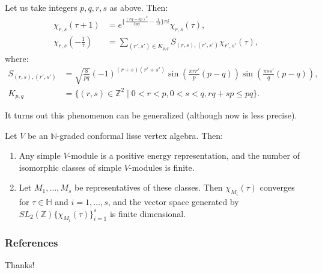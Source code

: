 \documentclass{beamer}
\begin{document}
\begin{frame}
  \begin{theorem}
    \label{thr:4}
    Let us take integers $p, q, r, s$ as above.
    Then:
    \begin{align}
      \label{eq:3}
      \chi_{r, s}(\tau + 1) &= e^{\{\frac{(rq - sp)^2}{2pq} - \frac{1}{12}\}\pi i}\chi_{r, s}(\tau), \\
      \label{eq:4}
      \chi_{r, s}\left(-\frac{1}{\tau}\right) &= \sum_{(r', s') \in K_{p, q}}S_{(r, s), (r', s')}\chi_{r', s'}(\tau),
    \end{align}
    where:
    \begin{align*}
      S_{(r, s), (r', s')} &= \sqrt{\frac{8}{pq}}(-1)^{(r + s)(r' + s')}\sin\left(\frac{\pi rr'}{p}(p - q)\right)\sin\left(\frac{\pi ss'}{q}(p - q)\right), \\
      K_{p, q} &= \{(r, s) \in \mathbb{Z}^2 \mid 0 < r < p, 0 < s < q, rq + sp \le pq\}.
    \end{align*}
  \end{theorem}
\end{frame}

\begin{frame}
  It turns out this phenomenon can be generalized (although now is less precise).
  \begin{theorem}
    \label{thr:5}
    Let $V$ be an $\mathbb{N}$-graded conformal lisse vertex algebra.
    Then:
    \begin{enumerate}
    \item Any simple $V$-module is a positive energy representation, and the number of isomorphic classes of simple $V$-modules is finite.
    \item Let $M_1, \dots, M_s$ be representatives of these classes.
      Then $\chi_{M_i}(\tau)$ converges for $\tau \in \mathbb{H}$ and $i = 1, \dots, s$, and the vector space generated by $SL_2(\mathbb{Z})\{\chi_{M_i}(\tau)\}_{i = 1}^s$ is finite dimensional.
    \end{enumerate}
  \end{theorem}
\end{frame}

\begin{frame}[allowframebreaks]
  \frametitle{References}
  \footnotesize
  
  
\end{frame}

\begin{frame}
  \begin{center}
    \Huge
    Thanks! \\
  \end{center}
\end{frame}
\end{document}
